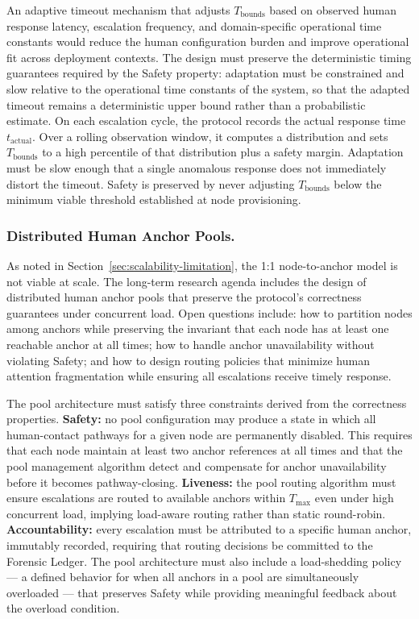 An adaptive timeout mechanism that adjusts $T_{\text{bounds}}$ based on observed human response latency, escalation frequency, and domain-specific operational time constants would reduce the human configuration burden and improve operational fit across deployment contexts. The design must preserve the deterministic timing guarantees required by the Safety property: adaptation must be constrained and slow relative to the operational time constants of the system, so that the adapted timeout remains a deterministic upper bound rather than a probabilistic estimate. On each escalation cycle, the protocol records the actual response time $t_{\text{actual}}$. Over a rolling observation window, it computes a distribution and sets $T_{\text{bounds}}$ to a high percentile of that distribution plus a safety margin. Adaptation must be slow enough that a single anomalous response does not immediately distort the timeout. Safety is preserved by never adjusting $T_{\text{bounds}}$ below the minimum viable threshold established at node provisioning.

\subsubsection{Distributed Human Anchor Pools.}\label{sec:fw-anchor-pools}

As noted in Section~\ref{sec:scalability-limitation}, the 1:1 node-to-anchor model is not viable at scale. The long-term research agenda includes the design of distributed human anchor pools that preserve the protocol's correctness guarantees under concurrent load. Open questions include: how to partition nodes among anchors while preserving the invariant that each node has at least one reachable anchor at all times; how to handle anchor unavailability without violating Safety; and how to design routing policies that minimize human attention fragmentation while ensuring all escalations receive timely response.

The pool architecture must satisfy three constraints derived from the correctness properties. \textbf{Safety:} no pool configuration may produce a state in which all human-contact pathways for a given node are permanently disabled. This requires that each node maintain at least two anchor references at all times and that the pool management algorithm detect and compensate for anchor unavailability before it becomes pathway-closing. \textbf{Liveness:} the pool routing algorithm must ensure escalations are routed to available anchors within $T_{\max}$ even under high concurrent load, implying load-aware routing rather than static round-robin. \textbf{Accountability:} every escalation must be attributed to a specific human anchor, immutably recorded, requiring that routing decisions be committed to the Forensic Ledger. The pool architecture must also include a load-shedding policy --- a defined behavior for when all anchors in a pool are simultaneously overloaded --- that preserves Safety while providing meaningful feedback about the overload condition.

